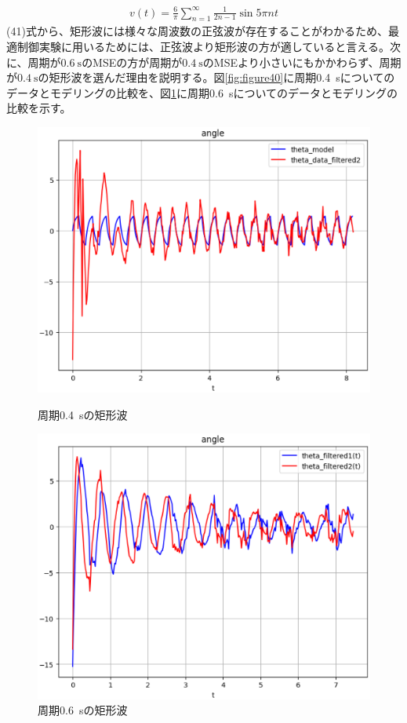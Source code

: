 \documentclass[a4paper,10.5pt]{ltjsarticle}
\begin{document}
\begin{align}
  v(t)=\frac{6}{\pi}\sum^{\infty}_{n=1}\frac{1}{2n-1}\sin{5\pi nt}
\end{align}
(41)式から、矩形波には様々な周波数の正弦波が存在することがわかるため、最適制御実験に用いるためには、正弦波より矩形波の方が適していると言える。次に、周期が$0.6\ \mathrm{s}$のMSEの方が周期が$0.4\ \mathrm{s}$のMSEより小さいにもかかわらず、周期が$0.4\ \mathrm{s}$の矩形波を選んだ理由を説明する。図\ref{fig:figure40}に周期0.4\ sについてのデータとモデリングの比較を、図\ref{fig:figure41}に周期0.6\ sについてのデータとモデリングの比較を示す。\\
\begin{figure}[h]
  \centering
  \begin{minipage}{0.4\linewidth}
    \includegraphics[scale=0.4]{figure40.eps}
    \caption{周期0.4\ sの矩形波}
    \label{fig:figure40}
  \end{minipage}
  \begin{minipage}{0.4\linewidth}
    \includegraphics[scale=0.4]{figure41.eps}
    \caption{周期0.6\ sの矩形波}
    \label{fig:figure41}
  \end{minipage}
\end{figure}\\
\end{document}
